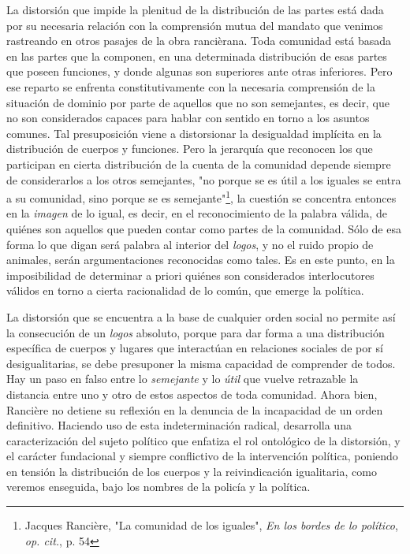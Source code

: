 \documentclass{book}
\begin{document}
La distorsión que impide la plenitud de la distribución de las partes
está dada por su necesaria relación con la comprensión mutua del mandato
que venimos rastreando en otros pasajes de la obra rancièrana. Toda
comunidad está basada en las partes que la componen, en una determinada
distribución de esas partes que poseen funciones, y donde algunas son
superiores ante otras inferiores. Pero ese reparto se enfrenta
constitutivamente con la necesaria comprensión de la situación de
dominio por parte de aquellos que no son semejantes, es decir, que no
son considerados capaces para hablar con sentido en torno a los asuntos
comunes. Tal presuposición viene a distorsionar la desigualdad implícita
en la distribución de cuerpos y funciones. Pero la jerarquía que
reconocen los que participan en cierta distribución de la cuenta de la
comunidad depende siempre de considerarlos a los otros semejantes, "no
porque se es útil a los iguales se entra a su comunidad, sino porque se
es semejante"\footnote{Jacques Rancière, "La comunidad de los iguales",
  \emph{En los bordes de lo político}, \emph{op. cit.}, p. 54}, la
cuestión se concentra entonces en la \emph{imagen} de lo igual, es
decir, en el reconocimiento de la palabra válida, de quiénes son
aquellos que pueden contar como partes de la comunidad. Sólo de esa
forma lo que digan será palabra al interior del \emph{logos}, y no el
ruido propio de animales, serán argumentaciones reconocidas como tales.
Es en este punto, en la imposibilidad de determinar a priori quiénes son
considerados interlocutores válidos en torno a cierta racionalidad de lo
común, que emerge la política.

La distorsión que se encuentra a la base de cualquier orden social no
permite así la consecución de un \emph{logos} absoluto, porque para dar
forma a una distribución específica de cuerpos y lugares que interactúan
en relaciones sociales de por sí desigualitarias, se debe presuponer la
misma capacidad de comprender de todos. Hay un paso en falso entre lo
\emph{semejante} y lo \emph{útil} que vuelve retrazable la distancia
entre uno y otro de estos aspectos de toda comunidad. Ahora bien,
Rancière no detiene su reflexión en la denuncia de la incapacidad de un
orden definitivo. Haciendo uso de esta indeterminación radical,
desarrolla una caracterización del sujeto político que enfatiza el rol
ontológico de la distorsión, y el carácter fundacional y siempre
conflictivo de la intervención política, poniendo en tensión la
distribución de los cuerpos y la reivindicación igualitaria, como
veremos enseguida, bajo los nombres de la policía y la política.
\end{document}
